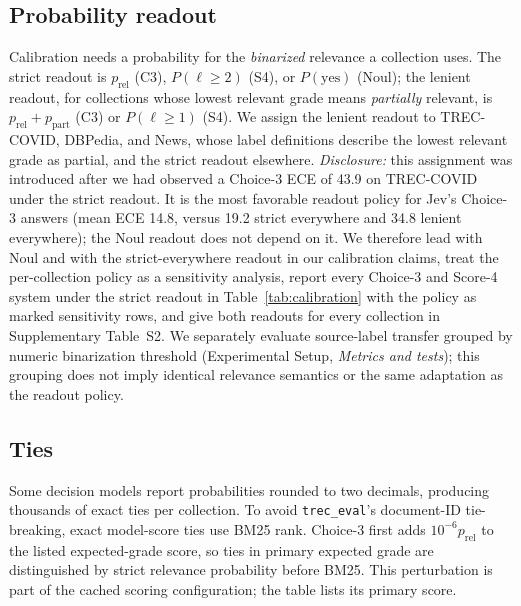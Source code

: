 \subsection{Probability readout}

Calibration needs a probability for the \emph{binarized} relevance a collection uses.
The strict readout is $p_\text{rel}$ (C3), $P(\ell\ge2)$ (S4), or $P(\text{yes})$ (Noul); the lenient readout, for collections whose lowest relevant grade means \emph{partially} relevant, is $p_\text{rel}+p_\text{part}$ (C3) or $P(\ell\ge1)$ (S4).
We assign the lenient readout to TREC-COVID, DBPedia, and News, whose label definitions describe the lowest relevant grade as partial, and the strict readout elsewhere.
\emph{Disclosure:} this assignment was introduced after we had observed a Choice-3 ECE of 43.9 on TREC-COVID under the strict readout. It is the most favorable readout policy for Jev's Choice-3 answers (mean ECE 14.8, versus 19.2 strict everywhere and 34.8 lenient everywhere); the Noul readout does not depend on it. We therefore lead with Noul and with the strict-everywhere readout in our calibration claims, treat the per-collection policy as a sensitivity analysis, report every Choice-3 and Score-4 system under the strict readout in Table~\ref{tab:calibration} with the policy as marked sensitivity rows, and give both readouts for every collection in Supplementary Table~S2. We separately evaluate source-label transfer grouped by numeric binarization threshold (Experimental Setup, \emph{Metrics and tests}); this grouping does not imply identical relevance semantics or the same adaptation as the readout policy.

\subsection{Ties}

Some decision models report probabilities rounded to two decimals, producing thousands of exact ties per collection.
To avoid \texttt{trec\_eval}'s document-ID tie-breaking, exact model-score ties use BM25 rank. Choice-3 first adds $10^{-6}p_{\mathrm{rel}}$ to the listed expected-grade score, so ties in primary expected grade are distinguished by strict relevance probability before BM25. This perturbation is part of the cached scoring configuration; the table lists its primary score.
